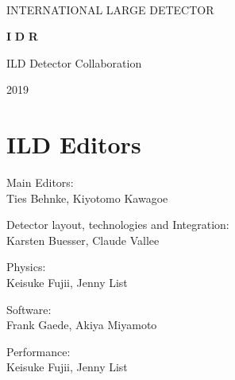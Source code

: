 %
%
\begin{titlepage}
\begin{center}
~
 ~\vskip 4cm

    {\huge  INTERNATIONAL} 
    {\huge  LARGE} 
    {\huge  DETECTOR}
    
  \vskip 1.2cm

    {\huge \bfseries I}
    {\huge \bfseries D}
    {\huge \bfseries R}

  \vskip 1.2cm




{\huge ILD Detector Collaboration} \\
    
  \vskip 0.5cm

{\huge }

  \vskip 3cm

    {\huge 2019}

\end{center}
\end{titlepage}

\newpage\thispagestyle{empty}
\cleardoublepage


\chapter*{ILD Editors}
\noindent Main Editors:\\
Ties Behnke, Kiyotomo Kawagoe

\vspace*{2mm}

\noindent Detector layout, technologies and Integration:\\
Karsten Buesser, Claude Vallee

\vspace*{2mm}
\noindent Physics:\\
Keisuke Fujii, Jenny List

\vspace*{2mm}
\noindent Software:\\
Frank Gaede, Akiya Miyamoto

\vspace*{2mm}
\noindent Performance:\\
Keisuke Fujii, Jenny List

